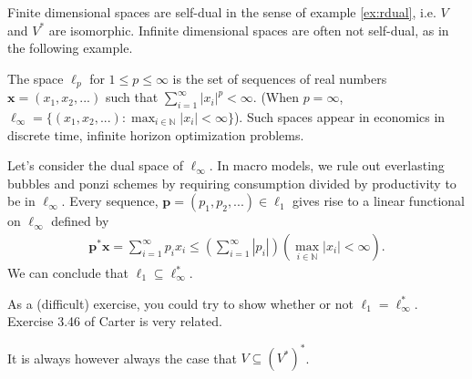 Finite dimensional spaces are self-dual in the sense of example
\ref{ex:rdual}, i.e. $V$ and $V^*$ are isomorphic. Infinite
dimensional spaces are often not self-dual, as in the following
example.
\begin{example}\label{ex:lpdual}
  The space $\ell_p$ for $1 \leq p \leq \infty$ is the set of
  sequences of real numbers $\mathbf{x}=(x_1, x_2, ...)$ such that
  $\sum_{i=1}^\infty |x_i|^p < \infty$. (When $p = \infty$, $\ell_\infty = \{ 
  (x_1, x_2, ...) : \max_{i \in \mathbb{N}} |x_i| < \infty \}$). Such
  spaces appear in economics in discrete time, infinite horizon
  optimization problems. 

  Let's consider the dual space of $\ell_\infty$. In macro models, we
  rule out everlasting bubbles and ponzi schemes by requiring
  consumption divided by productivity to be in $\ell_\infty$. Every
  sequence, $\mathbf{p} = (p_1, p_2, ...) \in \ell_1$ gives rise to a linear
  functional on $\ell_\infty$ defined by
  \begin{align*}
    \mathbf{p}^\ast \mathbf{x} = \sum_{i=1}^\infty p_i x_i \leq
    \left(\sum_{i=1}^\infty |p_i| \right) \left(\max_{i \in
        \mathbb{N}} |x_i| < \infty\right). 
  \end{align*}
  We can conclude that $\ell_1 \subseteq \ell_\infty^\ast$. 

  As a (difficult) exercise, you could try to show whether or not
  $\ell_1 = \ell_\infty^\ast$. Exercise 3.46 of Carter is very
  related. 
\end{example}
It is always however always the case that $V \subseteq (V^*)^*$. 

